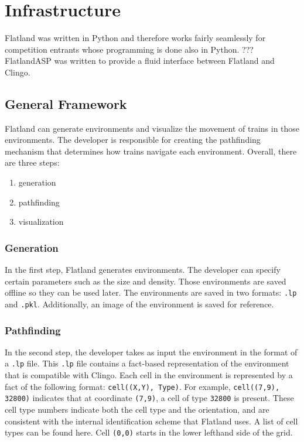 \documentclass[11pt]{article}
\begin{document}
\section{Infrastructure}
Flatland was written in Python and therefore works fairly seamlessly for competition entrants whose programming is done also in Python.  ??? FlatlandASP was written to provide a fluid interface between Flatland and Clingo.

\subsection{General Framework}
Flatland can generate environments and visualize the movement of trains in those environments. The developer is responsible for creating the pathfinding mechanism that determines how trains navigate each environment.  Overall, there are three steps:
\begin{enumerate}
	\item generation
	\item pathfinding
	\item visualization
\end {enumerate}

\subsubsection{Generation}
In the first step, Flatland generates environments. The developer can specify certain parameters such as the size and density. Those environments are saved offline so they can be used later. The environments are saved in two formats: \texttt{.lp} and \texttt{.pkl}. Additionally, an image of the environment is saved for reference.

\subsubsection{Pathfinding}
In the second step, the developer takes as input the environment in the format of a \texttt{.lp} file. This \texttt{.lp} file contains a fact-based representation of the environment that is compatible with Clingo. Each cell in the environment is represented by a fact of the following format: \texttt{cell((X,Y), Type)}. For example, \texttt{cell((7,9), 32800)} indicates that at coordinate \texttt{(7,9)}, a cell of type \texttt{32800} is present. These cell type numbers indicate both the cell type and the orientation, and are consistent with the internal identification scheme that Flatland uses. A list of cell types can be found here. Cell \texttt{(0,0)} starts in the lower lefthand side of the grid.
\end{document}
